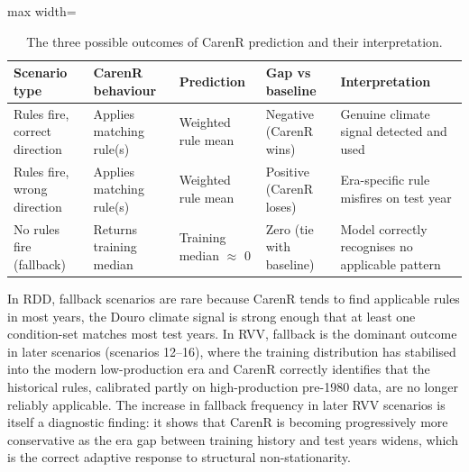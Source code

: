 \begin{table}[htbp]
  \centering
  \caption{The three possible outcomes of CarenR prediction and their interpretation.}\label{tab:ch5c_2}
  \small
  \begin{adjustbox}{max width=\textwidth}
    \begin{tabularx}{\textwidth}{p{2.4cm}|p{2.8cm}|p{2.2cm}|p{2.0cm}|X}
  \toprule
  Scenario type & CarenR behaviour & Prediction & Gap vs baseline & Interpretation \\
  \midrule
  Rules fire, correct direction & Applies matching rule(s) & Weighted rule mean & Negative (CarenR wins) & Genuine climate signal detected and used \\
  Rules fire, wrong direction & Applies matching rule(s) & Weighted rule mean & Positive (CarenR loses) & Era-specific rule misfires on test year \\
  No rules fire (fallback) & Returns training median & Training median $\approx$ 0 & Zero (tie with baseline) & Model correctly recognises no applicable pattern \\
  \bottomrule
\end{tabularx}
  \end{adjustbox}

\end{table}


In RDD, fallback scenarios are rare because CarenR tends to find applicable rules in most years, the Douro climate signal is strong enough that at least one condition-set matches most test years. In RVV, fallback is the dominant outcome in later scenarios (scenarios 12--16), where the training distribution has stabilised into the modern low-production era and CarenR correctly identifies that the historical rules, calibrated partly on high-production pre-1980 data, are no longer reliably applicable. The increase in fallback frequency in later RVV scenarios is itself a diagnostic finding: it shows that CarenR is becoming progressively more conservative as the era gap between training history and test years widens, which is the correct adaptive response to structural non-stationarity.
